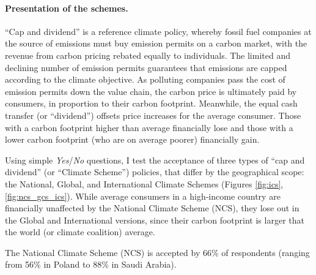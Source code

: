 \documentclass[12pt,english]{article}
\begin{document}
\begin{bibunit}
\paragraph{Presentation of the schemes.} ``Cap and dividend'' is a reference climate policy, %
whereby fossil fuel companies at the source of emissions must buy emission permits on a carbon market, with the revenue from carbon pricing rebated equally to individuals. The limited and declining number of emission permits guarantees that emissions are capped according to the climate objective. As polluting companies pass the cost of emission permits down the value chain, the carbon price is ultimately paid by consumers, in proportion to their carbon footprint. Meanwhile, the equal cash transfer (or ``dividend'') offsets price increases for the average consumer. Those with a carbon footprint higher than average financially lose and those with a lower carbon footprint (who are on average poorer) financially gain. 

Using simple \textit{Yes}/\textit{No} questions, I test the acceptance of three types of ``cap and dividend'' (or ``Climate Scheme'') policies, that differ by the geographical scope: the National, Global, and International Climate Schemes (Figures \ref{fig:ics}, \ref{fig:ncs_gcs_ics}). While average consumers in a high-income country are financially unaffected by the National Climate Scheme (NCS), they lose out in the Global and International versions, since their carbon footprint is larger that the world (or climate coalition) average. 

The National Climate Scheme (NCS) is accepted by 66\% of respondents (ranging from 56\% in Poland to 88\% in Saudi Arabia). 


\end{bibunit}
\end{document}
